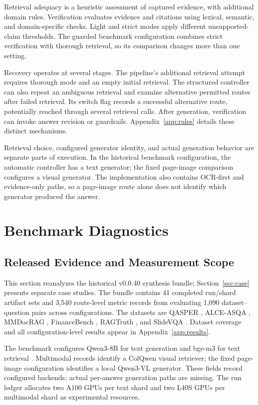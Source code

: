 Retrieval adequacy is a heuristic assessment of captured evidence, with additional domain rules. Verification evaluates evidence and citations using lexical, semantic, and domain-specific checks. Light and strict modes apply different unsupported-claim thresholds. The guarded benchmark configuration combines strict verification with thorough retrieval, so its comparison changes more than one setting.

Recovery operates at several stages. The pipeline's additional retrieval attempt requires thorough mode and an empty initial retrieval. The structured controller can also repeat an ambiguous retrieval and examine alternative permitted routes after failed retrieval. Its switch flag records a successful alternative route, potentially reached through several retrieval calls. After generation, verification can invoke answer revision or guardrails. Appendix~\ref{app:rules} details these distinct mechanisms.

Retrieval choice, configured generator identity, and actual generation behavior are separate parts of execution. In the historical benchmark configuration, the automatic controller has a text generator; the fixed page-image comparison configures a visual generator. The implementation also contains OCR-first and evidence-only paths, so a page-image route alone does not identify which generator produced the answer.

\section{Benchmark Diagnostics}
\label{sec:evaluation}
\subsection{Released Evidence and Measurement Scope}
This section reanalyzes the historical v0.0.40 synthesis bundle; Section~\ref{sec:case} presents separate case studies. The bundle contains 41 completed run/shard artifact sets and 3,540 route-level metric records from evaluating 1,090 dataset--question pairs across configurations. The datasets are QASPER \citep{dasigi2021qasper}, ALCE-ASQA \citep{gao2023alce}, MMDocRAG \citep{dong2025mmdocrag}, FinanceBench \citep{islam2023financebench}, RAGTruth \citep{niu2024ragtruth}, and SlideVQA \citep{tanaka2023slidevqa}. Dataset coverage and all configuration-level results appear in Appendix~\ref{app:results}.

The benchmark configures Qwen3-8B for text generation \citep{yang2025qwen3} and bge-m3 for text retrieval \citep{chen2024bgem3}. Multimodal records identify a ColQwen visual retriever; the fixed page-image configuration identifies a local Qwen3-VL generator. These fields record configured backends; actual per-answer generation paths are missing. The run ledger allocates two A100 GPUs per text shard and two L40S GPUs per multimodal shard as experimental resources.

